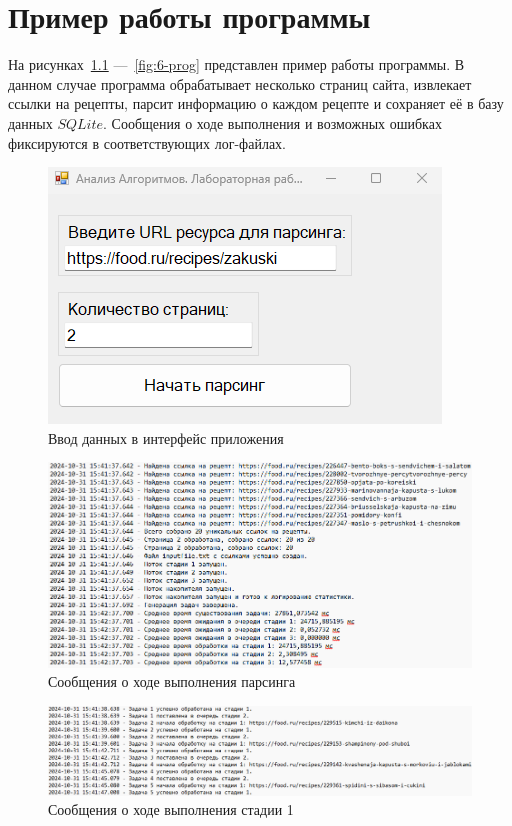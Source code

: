 \chapter{Пример работы программы}

На рисунках~\ref{fig:1-prog} ---~\ref{fig:6-prog} представлен пример работы программы. В данном случае программа обрабатывает несколько страниц сайта, извлекает ссылки на рецепты, парсит информацию о каждом рецепте и сохраняет её в базу данных $SQLite$. Сообщения о ходе выполнения и возможных ошибках фиксируются в соответствующих лог-файлах.

\begin{figure}[h]
	\centering
	\includegraphics[scale=0.8]{img/1-interface.png}
	\caption{Ввод данных в интерфейс приложения}
	\label{fig:1-prog}
\end{figure}
\begin{figure}[h]
	\centering
	\includegraphics[scale=0.5]{img/3-logmain.png}
	\caption{Сообщения о ходе выполнения парсинга}
	\label{fig:2-prog}
\end{figure}
\begin{figure}[h]
	\centering
	\includegraphics[scale=0.5]{img/4-log1.png}
	\caption{Сообщения о ходе выполнения стадии 1}
	\label{fig:3-prog}
\end{figure}
